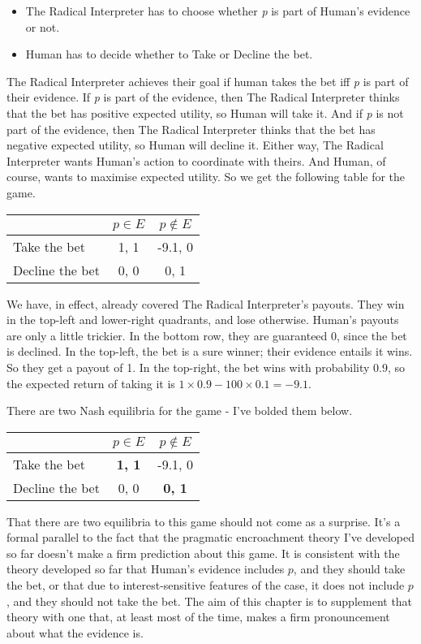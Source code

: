 \documentclass[11pt,]{book}
\providecommand{\tightlist}{%
  \setlength{\itemsep}{0pt}\setlength{\parskip}{0pt}}
\def\toprule{}
\def\bottomrule{}
\def\midrule{}
\begin{document}
\begin{itemize}
\tightlist
\item
  The Radical Interpreter has to choose whether \emph{p} is part of Human's evidence or not.
\item
  Human has to decide whether to Take or Decline the bet.
\end{itemize}

The Radical Interpreter achieves their goal if human takes the bet iff \emph{p} is part of their evidence. If \emph{p} is part of the evidence, then The Radical Interpreter thinks that the bet has positive expected utility, so Human will take it. And if \emph{p} is not part of the evidence, then The Radical Interpreter thinks that the bet has negative expected utility, so Human will decline it. Either way, The Radical Interpreter wants Human's action to coordinate with theirs. And Human, of course, wants to maximise expected utility. So we get the following table for the game.

\begin{longtable}[]{@{}lcc@{}}
\toprule
& \(p \in E\) & \(p \notin E\)\tabularnewline
\midrule
\endhead
Take the bet & 1, 1 & -9.1, 0\tabularnewline
Decline the bet & 0, 0 & 0, 1\tabularnewline
\bottomrule
\end{longtable}

We have, in effect, already covered The Radical Interpreter's payouts. They win in the top-left and lower-right quadrants, and lose otherwise. Human's payouts are only a little trickier. In the bottom row, they are guaranteed 0, since the bet is declined. In the top-left, the bet is a sure winner; their evidence entails it wins. So they get a payout of 1. In the top-right, the bet wins with probability 0.9, so the expected return of taking it is \(1 \times 0.9 - 100 \times 0.1 = -9.1\).

There are two Nash equilibria for the game - I've bolded them below.

\begin{longtable}[]{@{}lcc@{}}
\toprule
& \(p \in E\) & \(p \notin E\)\tabularnewline
\midrule
\endhead
Take the bet & \textbf{1, 1} & -9.1, 0\tabularnewline
Decline the bet & 0, 0 & \textbf{0, 1}\tabularnewline
\bottomrule
\end{longtable}

That there are two equilibria to this game should not come as a surprise. It's a formal parallel to the fact that the pragmatic encroachment theory I've developed so far doesn't make a firm prediction about this game. It is consistent with the theory developed so far that Human's evidence includes \(p\), and they should take the bet, or that due to interest-sensitive features of the case, it does not include \(p\), and they should not take the bet. The aim of this chapter is to supplement that theory with one that, at least most of the time, makes a firm pronouncement about what the evidence is.
\end{document}
